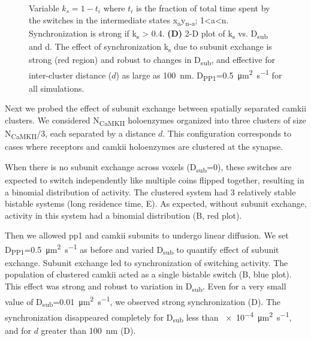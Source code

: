 \documentclass[9pt,lineno,doublespacing]{elife}
\newcommand\SUB[2]{#1\textsubscript{#2}}
\begin{document}
\begin{figure}
{        Variable $k_s=1-t_i$ where $t_i$ is the fraction of total time spent by
        the switches in the intermediate states
        x\textsubscript{a}y\textsubscript{n-a}; 1\textless{}a\textless{}n.
        Synchronization is strong if k\textsubscript{s} \textgreater{} 0.4.
        \textbf{(D)} 2-D plot of \SUB{k}{s} vs. \SUB{D}{sub} and d. The effect
        of synchronization \SUB{k}{s} due to subunit exchange is strong (red
        region) and robust to changes in \SUB{D}{sub}, and effective for
        inter-cluster distance ($d$) as large as \SI{100}{\nano\meter}. 
        \SUB{D}{PP1}=\SI{0.5}{\micro\meter\squared\per\second} for all
        simulations.
    }\label{fig:sync_spread}
\end{figure}

Next we probed the effect of subunit exchange between spatially separated
\gls{camkii} clusters. We considered \SUB{N}{CaMKII} holoenzymes organized into
three clusters of size \SUB{N}{CaMKII}/3, each separated by a distance \(d\).
This configuration corresponds to cases where receptors and \gls{camkii}
holoenzymes are clustered at the synapse. 

When there is no subunit exchange across voxels (\SUB{D}{sub}=0), these switches
are expected to switch independently like multiple coins flipped together,
resulting in a binomial distribution of activity. The clustered system had 3
relatively stable bistable systems (long residence time, E). As
expected, without subunit exchange, activity in this system had a binomial
distribution (B, red plot). 

Then we allowed \gls{pp1} and \gls{camkii} subunits to undergo linear diffusion.
We set \SUB{D}{PP1}=\SI{0.5}{\micro\meter\squared\per\second} as before and
varied \SUB{D}{sub} to quantify effect of subunit exchange. Subunit exchange led
to synchronization of switching activity. The population of clustered
\gls{camkii} acted as a single bistable switch (B, blue plot).
This effect was strong and robust to variation in \SUB{D}{sub}. Even for a very
small value of \SUB{D}{sub}=\SI{0.01}{\micro\meter\squared\per\second}, we
observed strong synchronization (D). The synchronization
disappeared completely for \SUB{D}{sub} less than
\SI{e-4}{\micro\meter\squared\per\second}, and for $d$ greater than
\SI{100}{\nano\meter} (D).
\end{document}
